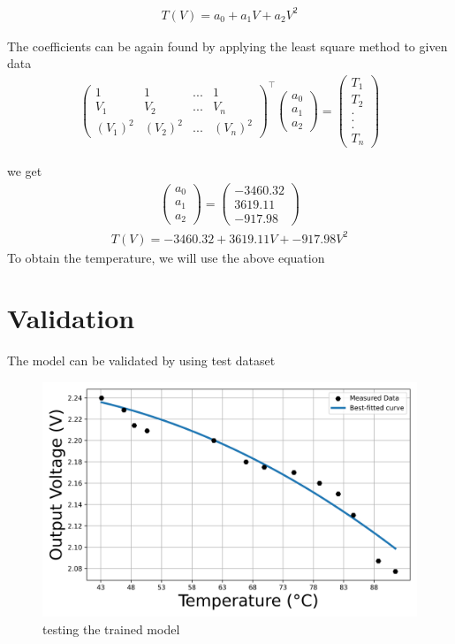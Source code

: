 \documentclass{article}
\newcommand{\myvec}[1]{\ensuremath{\begin{pmatrix}#1\end{pmatrix}}}
\begin{document}
\begin{align}
    T(V) = a_0 + a_1V + a_2V^2
\end{align}

The coefficients can be again found by applying the least square method to given data
\begin{align}
\myvec{1 & 1 & ... & 1\\
V_1 & V_2 & ... & V_n\\
(V_1)^2 & (V_2)^2 & ... & (V_n)^2}^\top  \myvec{a_0\\a_1\\a_2} = \myvec{T_1\\T_2\\.\\.\\.\\T_n}
\end{align}

we get
\begin{align}
\myvec{a_0\\a_1\\a_2} = \myvec{-3460.32\\3619.11\\-917.98}
\end{align}
\begin{align}
    T(V) = -3460.32 + 3619.11V + -917.98V^2
\end{align}
To obtain the temperature, we will use the above equation

\section{Validation}
The model can be validated by using test dataset


\newpage
\begin{figure}
    \centering
    \includegraphics[width=1\linewidth]{figs/test.png}
    \caption{testing the trained model}
    \label{fig:placeholder}
\end{figure}
\end{document}

